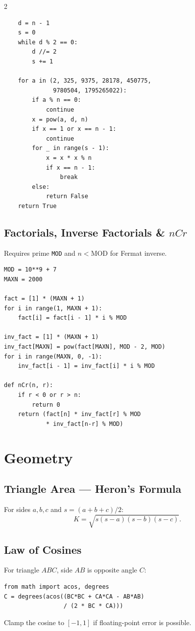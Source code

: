 \documentclass[9pt,a4paper]{extarticle}
\newcommand{\code}[1]{\texttt{#1}}
\begin{document}
\begin{multicols}{2}
\begin{lstlisting}
    d = n - 1
    s = 0
    while d % 2 == 0:
        d //= 2
        s += 1

    for a in (2, 325, 9375, 28178, 450775,
              9780504, 1795265022):
        if a % n == 0:
            continue
        x = pow(a, d, n)
        if x == 1 or x == n - 1:
            continue
        for _ in range(s - 1):
            x = x * x % n
            if x == n - 1:
                break
        else:
            return False
    return True
\end{lstlisting}

\subsection{Factorials, Inverse Factorials \& $nCr$}
Requires prime \code{MOD} and $n<\text{MOD}$ for Fermat inverse.
\begin{lstlisting}
MOD = 10**9 + 7
MAXN = 2000

fact = [1] * (MAXN + 1)
for i in range(1, MAXN + 1):
    fact[i] = fact[i - 1] * i % MOD

inv_fact = [1] * (MAXN + 1)
inv_fact[MAXN] = pow(fact[MAXN], MOD - 2, MOD)
for i in range(MAXN, 0, -1):
    inv_fact[i - 1] = inv_fact[i] * i % MOD

def nCr(n, r):
    if r < 0 or r > n:
        return 0
    return (fact[n] * inv_fact[r] % MOD
            * inv_fact[n-r] % MOD)
\end{lstlisting}

\section{Geometry}

\subsection{Triangle Area --- Heron's Formula}
For sides $a,b,c$ and $s=(a+b+c)/2$:
\[
K=\sqrt{s(s-a)(s-b)(s-c)}.
\]

\subsection{Law of Cosines}
For triangle $ABC$, side $AB$ is opposite angle $C$:
\begin{lstlisting}
from math import acos, degrees
C = degrees(acos((BC*BC + CA*CA - AB*AB)
                 / (2 * BC * CA)))
\end{lstlisting}
Clamp the cosine to $[-1,1]$ if floating-point error is possible.


\end{multicols}
\end{document}
